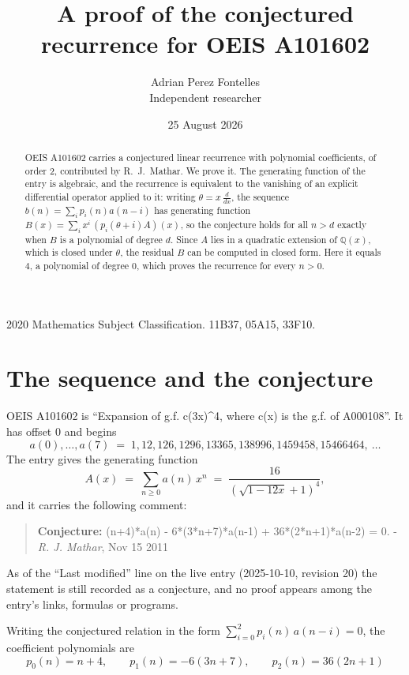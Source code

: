 \documentclass[11pt,a4paper]{article}
\title{A proof of the conjectured recurrence for OEIS A101602}
\author{Adrian Perez Fontelles\\ \small Independent researcher}
\date{25 August 2026}
\theoremstyle{plain}
\theoremstyle{definition}
\begin{document}
\maketitle

\begin{abstract}
OEIS A101602 carries a conjectured linear recurrence with polynomial coefficients, of
order 2, contributed by R.~J.~Mathar. We prove it. The generating function of the
entry is algebraic, and the recurrence is equivalent to the vanishing of an explicit
differential operator applied to it: writing $\theta=x\,\frac{d}{dx}$, the sequence
$b(n)=\sum_{i}p_{i}(n)a(n-i)$ has generating function
$B(x)=\sum_{i}x^{i}\,(p_{i}(\theta+i)A)(x)$, so the conjecture holds for all $n>d$ exactly
when $B$ is a polynomial of degree $d$. Since $A$ lies in a quadratic extension of
$\mathbb{Q}(x)$, which is closed under $\theta$, the residual $B$ can be computed in
closed form. Here it equals $4$, a polynomial of degree $0$, which proves
the recurrence for every $n>0$.
\end{abstract}

\noindent\small 2020 Mathematics Subject Classification. 11B37, 05A15, 33F10.\normalsize

\section{The sequence and the conjecture}

OEIS A101602 is ``Expansion of g.f. c(3x)\^{}4, where c(x) is the g.f. of A000108''. It has offset $0$ and begins
\[
a(0),\dots,a(7)\;=\;1, 12, 126, 1296, 13365, 138996, 1459458, 15466464,\ \dots
\]
The entry gives the generating function
\begin{equation}\label{eq:gf}
A(x)\;=\;\sum_{n\ge 0} a(n)\,x^{n}\;=\;\frac{16}{\left(\sqrt{1 - 12 x} + 1\right)^{4}} ,
\end{equation}
and it carries the following comment:
\begin{quote}\small
\textbf{Conjecture:} (n+4)*a(n) - 6*(3*n+7)*a(n-1) + 36*(2*n+1)*a(n-2) = 0. - \emph{R. J. Mathar}, Nov 15 2011
\end{quote}
As of the ``Last modified'' line on the live entry (2025-10-10, revision 20) the
statement is still recorded as a conjecture, and no proof appears among the entry's links,
formulas or programs.

Writing the conjectured relation in the form $\sum_{i=0}^{2}p_{i}(n)\,a(n-i)=0$,
the coefficient polynomials are
\[
p_{0}(n)=n + 4,\qquad p_{1}(n)=- 6 \left(3 n + 7\right),\qquad p_{2}(n)=36 \left(2 n + 1\right)
\]
\end{document}
